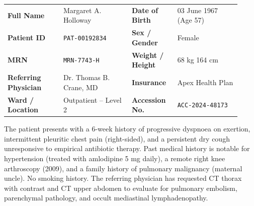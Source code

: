 \documentclass[11pt,a4paper]{article}
\begin{document}
\vspace{16mm}


\begin{tcolorbox}[radbox, title={\faUser\hspace{4pt}Patient Information}]
\vspace{4pt}
\begin{tabular}{@{}p{0.22\linewidth}p{0.27\linewidth}p{0.18\linewidth}p{0.25\linewidth}@{}}
  \small\color{RadSlate}\textbf{Full Name} &
  \small Margaret A. Holloway &
  \small\color{RadSlate}\textbf{Date of Birth} &
  \small 03 June 1967 (Age 57) \\[4pt]
  \small\color{RadSlate}\textbf{Patient ID} &
  \small \texttt{PAT-00192834} &
  \small\color{RadSlate}\textbf{Sex / Gender} &
  \small Female \\[4pt]
  \small\color{RadSlate}\textbf{MRN} &
  \small \texttt{MRN-7743-H} &
  \small\color{RadSlate}\textbf{Weight / Height} &
  \small 68 kg \textbar{} 164 cm \\[4pt]
  \small\color{RadSlate}\textbf{Referring Physician} &
  \small Dr. Thomas B. Crane, MD &
  \small\color{RadSlate}\textbf{Insurance} &
  \small Apex Health Plan \\[4pt]
  \small\color{RadSlate}\textbf{Ward / Location} &
  \small Outpatient -- Level 2 &
  \small\color{RadSlate}\textbf{Accession No.} &
  \small \texttt{ACC-2024-48173} \\
\end{tabular}
\vspace{4pt}
\end{tcolorbox}

\vspace{6pt}


\begin{tcolorbox}[tealbox, title={\faClipboardList\hspace{4pt}Clinical History \& Indication}]
\small
The patient presents with a 6-week history of progressive dyspnoea on exertion, intermittent pleuritic chest pain (right-sided), and a persistent dry cough unresponsive to empirical antibiotic therapy. Past medical history is notable for hypertension (treated with amlodipine 5 mg daily), a remote right knee arthroscopy (2009), and a family history of pulmonary malignancy (maternal uncle). No smoking history. The referring physician has requested CT thorax with contrast and CT upper abdomen to evaluate for pulmonary embolism, parenchymal pathology, and occult mediastinal lymphadenopathy.
\end{tcolorbox}
\end{document}
